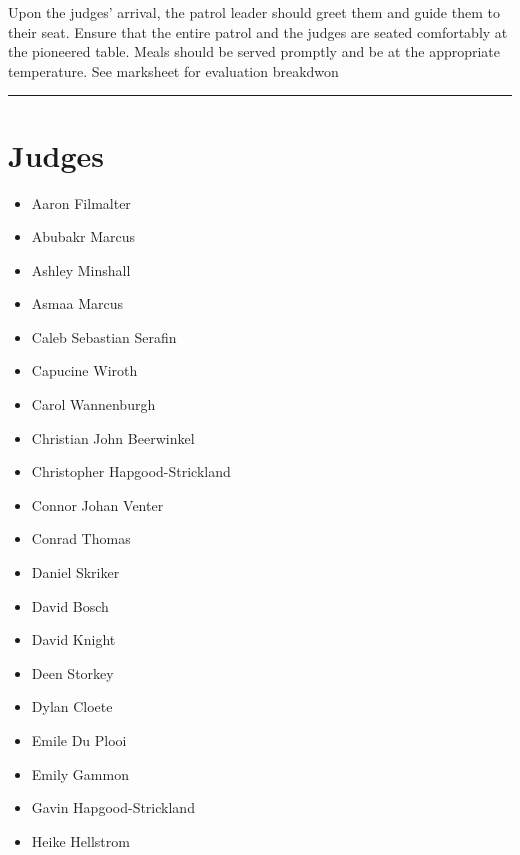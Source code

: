 \documentclass[10pt]{article}
\begin{document}
Upon the judges' arrival, the patrol leader should greet them and guide them to their seat. Ensure that the entire patrol and the judges are seated comfortably at the pioneered table. Meals should be served promptly and be at the appropriate temperature. See marksheet for evaluation breakdwon
\vspace{0.5cm}
	\hrule
	\vspace{0.5cm}
		\section*{\faUsers \: Judges}

		

	\begin{multicols}{2}

		\begin{itemize}
									\item Aaron Filmalter
									\item Abubakr Marcus
									\item Ashley Minshall
									\item Asmaa Marcus
									\item Caleb Sebastian Serafin
									\item Capucine Wiroth
									\item Carol Wannenburgh
									\item Christian John Beerwinkel
									\item Christopher Hapgood-Strickland
									\item Connor Johan Venter
									\item Conrad Thomas
									\item Daniel Skriker
									\item David Bosch
									\item David Knight
									\item Deen Storkey
									\item Dylan Cloete
									\item Emile Du Plooi
									\item Emily Gammon
									\item Gavin Hapgood-Strickland
									\item Heike Hellstrom
						\end{itemize}

		\vfill\null
		\columnbreak


\end{multicols}
\end{document}

